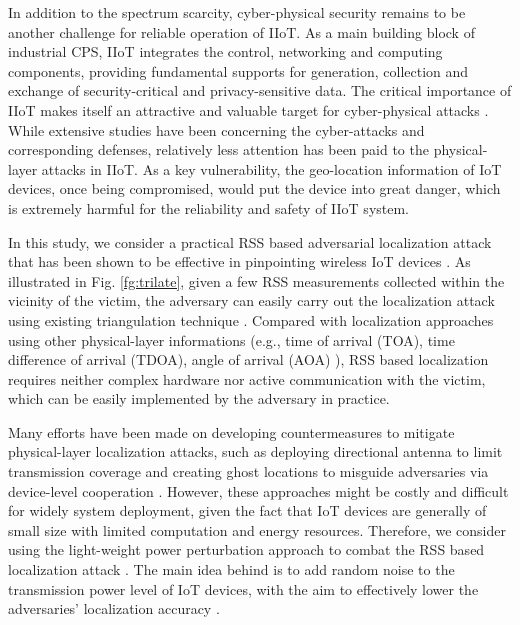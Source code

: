 In addition to the spectrum scarcity, cyber-physical security remains to be another challenge for reliable operation of IIoT. As a main building block of industrial CPS, IIoT integrates the control, networking and computing components, providing fundamental supports for generation, collection and exchange of security-critical and privacy-sensitive data. The critical importance of IIoT makes itself an attractive and valuable target for cyber-physical attacks \cite{securitysuvey}. While extensive studies have been concerning the cyber-attacks and corresponding defenses, relatively less attention has been paid to the physical-layer attacks in IIoT. 
As a key vulnerability, the geo-location information of IoT devices, once being compromised, would put the device into great danger, which is extremely harmful for the reliability and safety of IIoT system. 

In this study, we consider a practical RSS based adversarial localization attack that has been shown to be effective in pinpointing wireless IoT devices \cite{LocalizationLi}. 
As illustrated in Fig. \ref{fg:trilate}, given a few RSS measurements collected within the vicinity of the victim, the adversary can easily carry out the localization attack using existing triangulation technique \cite{TOARSS}. Compared with localization approaches using other physical-layer informations (e.g., time of arrival (TOA), time difference of arrival (TDOA), angle of arrival (AOA) \cite{Gezici:08}), RSS based localization requires neither complex hardware nor active communication with the victim, which can be easily implemented by the adversary in practice.

Many efforts have been made on developing countermeasures to mitigate physical-layer localization attacks, such as deploying directional antenna to limit transmission coverage \cite{antenna} and creating ghost locations to misguide adversaries via device-level cooperation \cite{Sangho12}. However, these approaches might be costly and difficult for widely system deployment, given the fact that IoT devices are generally of small size with limited computation and energy resources. Therefore, we consider using the light-weight power perturbation approach to combat the RSS based localization attack \cite{Jiang07}. The main idea behind is to add random noise to the transmission power level of IoT devices, with the aim to effectively lower the adversaries' localization accuracy \cite{EI10}. 

